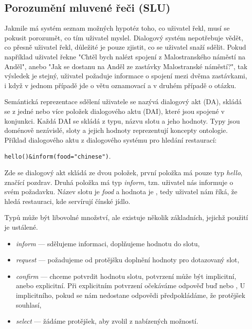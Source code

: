 \subsection{Porozumění mluvené řeči (SLU)}

Jakmile má systém seznam možných hypotéz toho, co uživatel řekl, musí se pokusit porozumět, co tím uživatel myslel.
Dialogový systém nepotřebuje vědět, co přesně uživatel řekl, důležité je pouze zjistit, co se uživatel snaží sdělit.
Pokud například uživatel řekne "Chtěl bych nalézt spojení z Malostranského náměstí na Anděl", anebo "Jak se dostanu na Anděl ze zastávky Malostranské náměstí?", tak výsledek je stejný, uživatel požaduje informace o spojení mezi dvěma zastávkami, i když v jednom případě jde o větu oznamovací a v druhém případě o otázku.

Semántická reprezentace sdělení uživatele se nazývá dialogový akt (DA), skládá se z jedné nebo více položek dialogového aktu (DAI), které jsou spojené v konjunkci.
Každá DAI se skládá z typu, názvu slotu a jeho hodnoty. Typy jsou doménově nezávislé, sloty a jejich hodnoty reprezentují koncepty ontologie.
Příklad dialogového aktu z dialogového systému pro hledání restaurací:

\begin{center}
{\tt hello()\&inform(food="chinese")}.
\end{center}

Zde se dialogový akt skládá ze dvou položek, první položka má pouze typ {\em hello}, značící pozdrav.
Druhá položka má typ {\em inform}, tzn. uživatel nás informuje o svém požadavku.
Název slotu je {\em food} a hodnota je , tedy uživatel nám říká, že hledá restauraci, kde servírují čínské jídlo.

Typů může být libovolné množství, ale existuje několik základních, jejichž použití je ustálené.
\begin{itemize}
\item {\em inform} --- sdělujeme informaci, doplňujeme hodnotu do slotu,
\item {\em request} --- požadujeme od protějšku doplnění hodnoty pro dotazovaný slot,
\item {\em confirm} --- chceme potvrdit hodnotu slotu, potvrzení může být implicitní, anebo explicitní.
	Při explicitním potvrzení očekáváme odpověď buď  nebo ,
	U implicitního, pokud se nám nedostane odpovědi předpokládáme, že protějšek souhlasí,
\item {\em select} --- žádáme protějšek, aby zvolil z nabízených možností.
\end{itemize}

